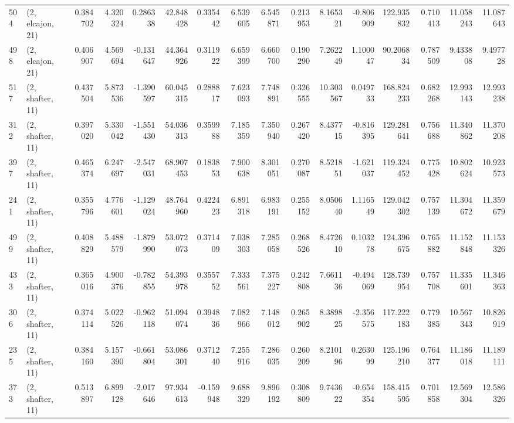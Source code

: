 \begin{tabular}{llrrrrrrrrrrrrrr}
504 &  (2, elcajon, 21) &   0.384702 &   4.320324 &   0.286338 &    42.848428 &   0.335442 &   6.539605 &   6.545871 &  0.213953 &   8.165321 &  -0.806909 &    122.935832 &   0.710413 &   11.058243 &   11.087643 \\
498 &  (2, elcajon, 21) &   0.406907 &   4.569694 &  -0.131647 &    44.364926 &   0.311922 &   6.659399 &   6.660700 &  0.190290 &   7.262249 &   1.100047 &     90.206834 &   0.787509 &    9.433808 &    9.497728 \\
517 &  (2, shafter, 11) &   0.437504 &   5.873536 &  -1.390597 &    60.045315 &   0.288817 &   7.623093 &   7.748891 &  0.326555 &  10.303567 &   0.049733 &    168.824233 &   0.682268 &   12.993143 &   12.993238 \\
312 &  (2, shafter, 11) &   0.397020 &   5.330042 &  -1.551430 &    54.036313 &   0.359988 &   7.185359 &   7.350940 &  0.267420 &   8.437715 &  -0.816395 &    129.281641 &   0.756688 &   11.340862 &   11.370208 \\
397 &  (2, shafter, 11) &   0.465374 &   6.247697 &  -2.547031 &    68.907453 &   0.183853 &   7.900638 &   8.301051 &  0.270087 &   8.521851 &  -1.621037 &    119.324452 &   0.775428 &   10.802624 &   10.923573 \\
241 &  (2, shafter, 11) &   0.355796 &   4.776601 &  -1.129024 &    48.764960 &   0.422423 &   6.891318 &   6.983191 &  0.255152 &   8.050640 &   1.116549 &    129.042302 &   0.757139 &   11.304672 &   11.359679 \\
499 &  (2, shafter, 11) &   0.408829 &   5.488579 &  -1.879990 &    53.072073 &   0.371409 &   7.038303 &   7.285058 &  0.268526 &   8.472610 &   0.103278 &    124.396675 &   0.765882 &   11.152848 &   11.153326 \\
433 &  (2, shafter, 11) &   0.365016 &   4.900376 &  -0.782855 &    54.393978 &   0.355752 &   7.333561 &   7.375227 &  0.242808 &   7.661136 &  -0.494069 &    128.739954 &   0.757708 &   11.335601 &   11.346363 \\
306 &  (2, shafter, 11) &   0.374114 &   5.022526 &  -0.962118 &    51.094074 &   0.394836 &   7.082966 &   7.148012 &  0.265902 &   8.389825 &  -2.356575 &    117.222183 &   0.779385 &   10.567343 &   10.826919 \\
235 &  (2, shafter, 11) &   0.384160 &   5.157390 &  -0.661804 &    53.086301 &   0.371240 &   7.255916 &   7.286035 &  0.260209 &   8.210196 &   0.263099 &    125.196210 &   0.764377 &   11.186018 &   11.189111 \\
373 &  (2, shafter, 11) &   0.513897 &   6.899128 &  -2.017646 &    97.934613 &  -0.159948 &   9.688329 &   9.896192 &  0.308809 &   9.743622 &  -0.654354 &    158.415595 &   0.701858 &   12.569304 &   12.586326 \\

\end{tabular}
